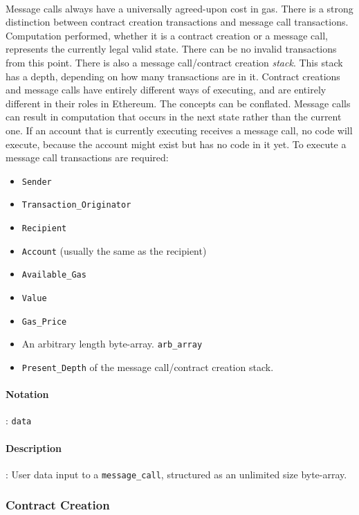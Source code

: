 \documentclass[10pt,a4paper,leqno,bibliography=totoc]{scrartcl}
\newenvironment{alphafootnotes}
{\par\edef\savedfootnotenumber{\number\value{footnote}}
\renewcommand{\thefootnote}{\alph{footnote}}
\setcounter{footnote}{0}}
{\par\setcounter{footnote}{\savedfootnotenumber}}
\begin{document}
\begin{alphafootnotes}
\begin{multicols*}{2}
\paragraph{}Message calls always have a universally agreed-upon cost in gas. There is a strong distinction between contract creation transactions and message call transactions. Computation performed, whether it is a contract creation or a message call, represents the currently legal valid state. There can be no invalid transactions from this point. \supercite{Wood2017} There is also a message call/contract creation \textit{stack}. This stack has a depth, depending on how many transactions are in it. Contract creations and message calls have entirely different ways of executing, and are entirely different in their roles in Ethereum. The concepts can be conflated. Message calls can result in computation that occurs in the next state rather than the current one. If an account that is currently executing receives a message call, no code will execute, because the account might exist but has no code in it yet. To execute a message call transactions are required:

\begin{itemize}
	\item \texttt{Sender}
	\item \texttt{Transaction\_Originator} 
	\item \texttt{Recipient}
	\item \texttt{Account} (usually the same as the recipient) 
	\item \texttt{Available\_Gas} 
	\item \texttt{Value}
	\item \texttt{Gas\_Price}
	\item An arbitrary length byte-array. \texttt{arb\_array}
	\item \texttt{Present\_Depth} of the message call/contract creation stack.
\end{itemize}
\paragraph{Notation}: \texttt{data}
\paragraph{Description}: User data input to a \texttt{message\_call}, structured as an unlimited size byte-array.

			\subsubsection{Contract Creation}

\end{multicols*}
\end{alphafootnotes}
\end{document}

